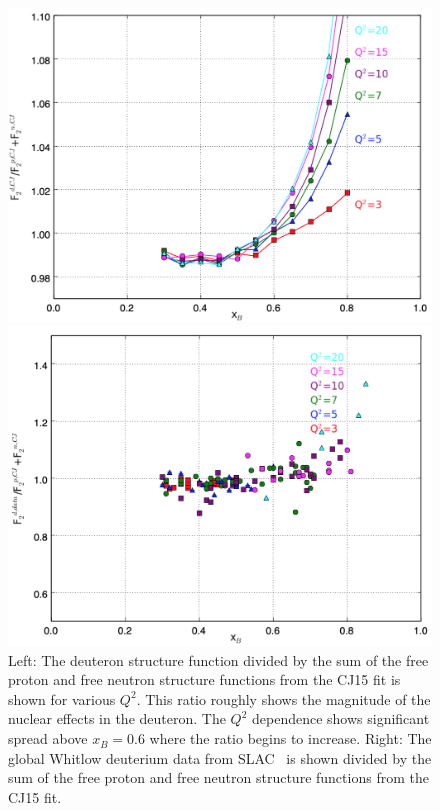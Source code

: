 \documentclass[oneside]{article}
\begin{document}
 \begin{figure}
\begin{minipage}{0.5\textwidth}
 \includegraphics[width=\textwidth]{plots/dpn_allCJ.png}
\end{minipage}\hfill\begin{minipage}{0.5\textwidth}
 \includegraphics[width=\textwidth]{plots/deuterium_q2.png}
 \end{minipage}
  \caption[]{Left: The deuteron structure function divided by the sum of the free proton and free neutron structure functions from the CJ15 fit is shown for various $Q^2$. This ratio roughly shows the magnitude of the nuclear effects in the deuteron. The $Q^2$ dependence shows significant spread above $x_B=0.6$ where the ratio begins to increase. Right: The global Whitlow deuterium data from SLAC~\cite{XS_d} is shown divided by the sum of the free proton and free neutron structure functions from the CJ15 fit.}
  \label{fig:dpn_cj}
\end{figure}  
 
\end{document}
